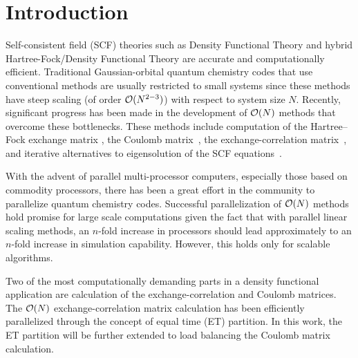 \commentoutA{\documentclass[prl,aps,twocolumn,twocolumngrid,superbib]{revtex4}}
\begin{document}

\section{Introduction}
\label{sec:intro}
Self-consistent field (SCF) theories such as Density Functional Theory
and hybrid Hartree-Fock/Density Functional Theory are accurate and
computationally efficient. Traditional Gaussian-orbital quantum
chemistry codes that use conventional methods\cite{ASzabo89} are
usually restricted to small systems since these methods have steep
scaling (of order ${\cal O}(N^{2-3})$) with respect to system size
$N$.  Recently, significant progress has been made in the development
of ${\cal O}(N)$ methods that overcome these bottlenecks.  These
methods include computation of the Hartree--Fock exchange matrix
\cite{ESchwegler96,ESchwegler97,ESchwegler98A,ESchwegler99,ESchwegler00,CTymczak04b},
the Coulomb
matrix~\cite{CWhite94B,CWhite96A,MChallacombe96,MChallacombe96B,MStrain96,JPerezjorda97,MChallacombe97,CTymczak04a},
the exchange-correlation
matrix~\cite{CTymczak04a,Jorda95,RStratmann96,CGuerra98,MChallacombe00A},
and iterative alternatives to eigensolution of the SCF
equations~\cite{XLi93,MDaw93,SQiu94,EHernandez96,ADaniels97,APalser98,MChallacombe99,ANiklasson02A,ANiklasson03}.

With the advent of parallel multi-processor computers, especially
those based on commodity processors, there has been a great effort in
the community to parallelize quantum chemistry
codes\cite{Harrison_94v45,Guerra_95,Stephan_98v108,Sosa_98v19,Furlani_00v128,Sosa_00v26,Yoshihiro_01v346,Baker_02v23,JBaker04}.
Successful parallelization of ${\cal O}(N)$ methods hold promise for
large scale computations given the fact that with parallel linear
scaling methods, an $n$-fold increase in processors should lead
approximately to an $n$-fold increase in simulation
capability. However, this holds only for scalable algorithms.

Two of the most computationally demanding parts in a density
functional application are calculation of the exchange-correlation and
Coulomb matrices. The ${\cal O}(N)$ exchange-correlation matrix
calculation has been efficiently parallelized through the concept of
equal time (ET) partition\cite{CGan03}.  In this work, the ET
partition will be further extended to load balancing the Coulomb
matrix calculation.
\end{document}
